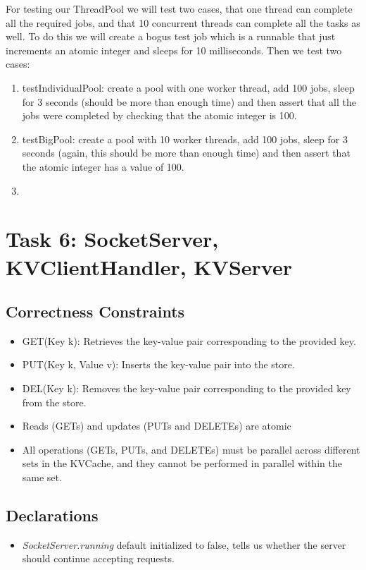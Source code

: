 \documentclass{article}
\begin{document}
For testing our ThreadPool we will test two cases, that one thread can complete all the required jobs, and that 10
concurrent threads can complete all the tasks as well. To do this we will create a bogus test job which is a runnable
that just increments an atomic integer and sleeps for 10 milliseconds. Then we test two cases:
\begin{enumerate}
\item testIndividualPool: create a pool with one worker thread, add 100 jobs, sleep for 3 seconds (should be more than
enough time) and then assert that all the jobs were completed by checking that the atomic integer is 100.
\item testBigPool: create a pool with 10 worker threads, add 100 jobs, sleep for 3 seconds (again, this should be more
than enough time) and then assert that the atomic integer has a value of 100.
\item
\end{enumerate}

\section*{Task 6: SocketServer, KVClientHandler, KVServer}
\subsection*{Correctness Constraints}
\begin{itemize}
\item GET(Key k): Retrieves the key-value pair corresponding to the provided key.
\item PUT(Key k, Value v): Inserts the key-value pair into the store.
\item DEL(Key k): Removes the key-value pair corresponding to the provided key from the store.
\item Reads (GETs) and updates (PUTs and DELETEs) are atomic
\item All operations (GETs, PUTs, and DELETEs) must be parallel across different sets in the KVCache, and they cannot be performed in parallel within the same set.
\end{itemize}
\subsection*{Declarations}
\begin{itemize}
\item \textit{SocketServer.running} default initialized to false, tells us whether the server should continue accepting
requests.
\end{itemize}
\end{document}
